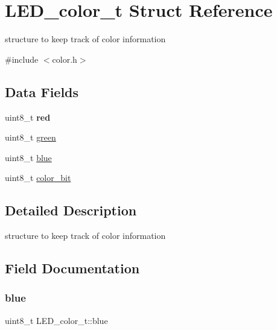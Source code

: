 \hypertarget{struct_l_e_d__color__t}{}\section{L\+E\+D\+\_\+color\+\_\+t Struct Reference}
\label{struct_l_e_d__color__t}


structure to keep track of color information  




{\ttfamily \#include $<$color.\+h$>$}

\subsection*{Data Fields}
\begin{DoxyCompactItemize}
\item 
\hypertarget{struct_l_e_d__color__t_a474d02b87c3d66c1735fda7cb3f2f536}{}\label{struct_l_e_d__color__t_a474d02b87c3d66c1735fda7cb3f2f536} 
uint8\+\_\+t {\bfseries red}
\item 
uint8\+\_\+t \hyperlink{struct_l_e_d__color__t_a48151ec2a427af0f3343e7eb10fb929a}{green}
\item 
uint8\+\_\+t \hyperlink{struct_l_e_d__color__t_a5056f37cab63d788a659e98cbcc03d4d}{blue}
\item 
uint8\+\_\+t \hyperlink{struct_l_e_d__color__t_ae24077cc2ae26c649bb6a6a07273e86e}{color\+\_\+bit}
\end{DoxyCompactItemize}


\subsection{Detailed Description}
structure to keep track of color information 

\subsection{Field Documentation}
\hypertarget{struct_l_e_d__color__t_a5056f37cab63d788a659e98cbcc03d4d}{}\label{struct_l_e_d__color__t_a5056f37cab63d788a659e98cbcc03d4d} 
\subsubsection{\texorpdfstring{blue}{blue}}
{\footnotesize\ttfamily uint8\+\_\+t L\+E\+D\+\_\+color\+\_\+t\+::blue}

